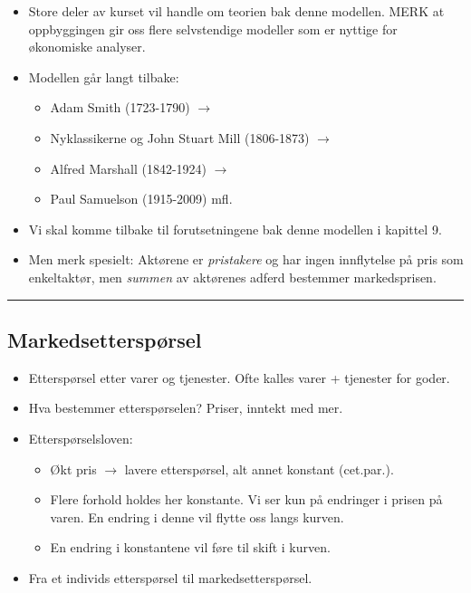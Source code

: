 \documentclass[
  letterpaper,
  DIV=11,
  numbers=noendperiod]{scrartcl}
\providecommand{\tightlist}{%
  \setlength{\itemsep}{0pt}\setlength{\parskip}{0pt}}\usepackage{longtable,booktabs,array}
\begin{document}
\begin{itemize}
\tightlist
\item
  Store deler av kurset vil handle om teorien bak denne modellen. MERK
  at oppbyggingen gir oss flere selvstendige modeller som er nyttige for
  økonomiske analyser.
\item
  Modellen går langt tilbake:

  \begin{itemize}
  \tightlist
  \item
    Adam Smith (1723-1790) \(\rightarrow\)
  \item
    Nyklassikerne og John Stuart Mill (1806-1873) \(\rightarrow\)
  \item
    Alfred Marshall (1842-1924) \(\rightarrow\)
  \item
    Paul Samuelson (1915-2009) mfl.
  \end{itemize}
\item
  Vi skal komme tilbake til forutsetningene bak denne modellen i
  kapittel 9.
\item
  Men merk spesielt: Aktørene er \emph{pristakere} og har ingen
  innflytelse på pris som enkeltaktør, men \emph{summen} av aktørenes
  adferd bestemmer markedsprisen.
\end{itemize}

\begin{center}\rule{0.5\linewidth}{0.5pt}\end{center}

\subsection{Markedsetterspørsel}\label{markedsetterspuxf8rsel}

\begin{itemize}
\tightlist
\item
  Etterspørsel etter varer og tjenester. Ofte kalles varer + tjenester
  for goder.
\item
  Hva bestemmer etterspørselen? Priser, inntekt med mer.
\item
  Etterspørselsloven:

  \begin{itemize}
  \tightlist
  \item
    Økt pris \(\rightarrow\) lavere etterspørsel, alt annet konstant
    (cet.par.).
  \item
    Flere forhold holdes her konstante. Vi ser kun på endringer i prisen
    på varen. En endring i denne vil flytte oss langs kurven.
  \item
    En endring i konstantene vil føre til skift i kurven.
  \end{itemize}
\item
  Fra et individs etterspørsel til markedsetterspørsel.
\end{itemize}
\end{document}
